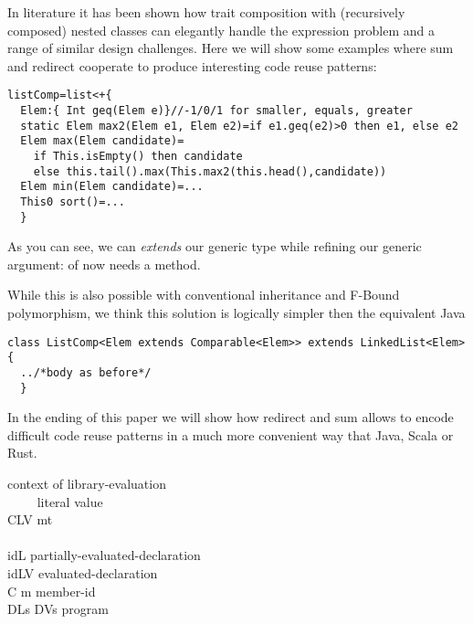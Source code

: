 In literature it has been shown how trait composition with (recursively composed) nested classes can 
elegantly handle the expression problem and a range of similar design challenges.
Here we will show some examples where sum and redirect cooperate to produce interesting code reuse patterns:

\begin{lstlisting}
listComp=list<+{
  Elem:{ Int geq(Elem e)}//-1/0/1 for smaller, equals, greater
  static Elem max2(Elem e1, Elem e2)=if e1.geq(e2)>0 then e1, else e2
  Elem max(Elem candidate)=
    if This.isEmpty() then candidate
    else this.tail().max(This.max2(this.head(),candidate))
  Elem min(Elem candidate)=...
  This0 sort()=...
  }
\end{lstlisting}
As you can see, we can \emph{extends} our generic type while refining our generic argument:
\Q@Elem@ of \Q@listComp@ now needs a \Q@geq@ method.

While this is also possible with conventional inheritance and F-Bound polymorphism, we think this solution is logically simpler then the equivalent Java
\begin{lstlisting}
class ListComp<Elem extends Comparable<Elem>> extends LinkedList<Elem>{
  ../*body as before*/
  }
\end{lstlisting}

In the ending of this paper we will show how redirect and sum allows to encode
difficult code reuse patterns in a much more convenient way that Java, Scala or Rust.


\begin{bnf}
  {context of library-evaluation}\\     {\ \ \mmid{}\ \ }       {literal value}\\     {C\eq{}LV \mmid{} mt}                                                    {}\\           {}\\     {id\eq{}L}                                                         {partially-evaluated-declaration}\\     {id\eq{}LV}                                                       {evaluated-declaration}\\    {C \mmid{} m}                                                      {member-id}\\      {DLs\Q{;} DVs}                                                     {program}
\end{bnf}

